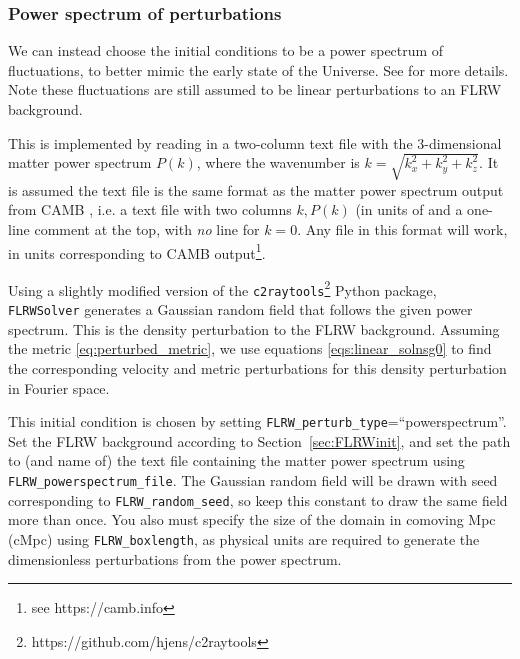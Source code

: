 \subsubsection{Power spectrum of perturbations}

We can instead choose the initial conditions to be a power spectrum of fluctuations, to better mimic the early state of the Universe. See \cite{macpherson2019} for more details. 
Note these fluctuations are still assumed to be linear perturbations to an FLRW background. 

This is implemented by reading in a two-column text file with the 3-dimensional matter power spectrum $P(k)$, where the wavenumber is $k=\sqrt{k_x^2+k_y^2+k_z^2}$. It is assumed the text file is the same format as the matter power spectrum output from CAMB \cite{lewis2002}, i.e. a text file with two columns $k, P(k)$ (in units of  and a one-line comment at the top, with \emph{no} line for $k=0$. Any file in this format will work, in units corresponding to CAMB output\footnote{see https://camb.info}.

Using a slightly modified version of the \texttt{c2raytools}\footnote{https://github.com/hjens/c2raytools} Python package, \texttt{FLRWSolver} generates a Gaussian random field that follows the given power spectrum. This is the density perturbation to the FLRW background. Assuming the metric \eqref{eq:perturbed_metric}, we use equations \eqref{eqs:linear_solnsg0} to find the corresponding velocity and metric perturbations for this density perturbation in Fourier space.

This initial condition is chosen by setting \texttt{FLRW\_perturb\_type}=``powerspectrum''. Set the FLRW background according to Section~\ref{sec:FLRWinit}, and set the path to (and name of) the text file containing the matter power spectrum using \texttt{FLRW\_powerspectrum\_file}. The Gaussian random field will be drawn with seed corresponding to \texttt{FLRW\_random\_seed}, so keep this constant to draw the same field more than once. You also must specify the size of the domain in comoving Mpc (cMpc) using \texttt{FLRW\_boxlength}, as physical units are required to generate the dimensionless perturbations from the power spectrum. 




